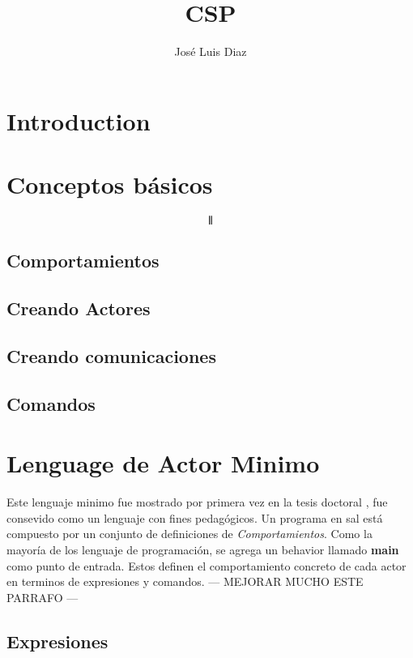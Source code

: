 \documentclass[fleqn]{article}
\title{CSP}
\author{José Luis Diaz}
\date{ }
\begin{document}
 
\maketitle
 
\tableofcontents
 
\section{Introduction}

\section{Conceptos básicos}


$$\interleave$$

\subsection*{Comportamientos}

\subsection*{Creando Actores}

\subsection*{Creando comunicaciones}

\subsection*{Comandos}

\section{Lenguage de Actor Minimo}

Este lenguaje minimo fue mostrado por primera vez en la tesis doctoral
\cite{Agha:1986:AMC:7929}, fue consevido como un lenguaje con fines pedagógicos.
Un programa en sal está compuesto por un conjunto de definiciones de
\textit{Comportamientos}. Como la mayoría de los lenguaje de programación,
se agrega un behavior llamado \textbf{main} como punto de entrada.
Estos definen el comportamiento concreto de cada actor en terminos de
expresiones y comandos.
--- MEJORAR MUCHO ESTE PARRAFO ---

\subsection{Expresiones}
\end{document}
